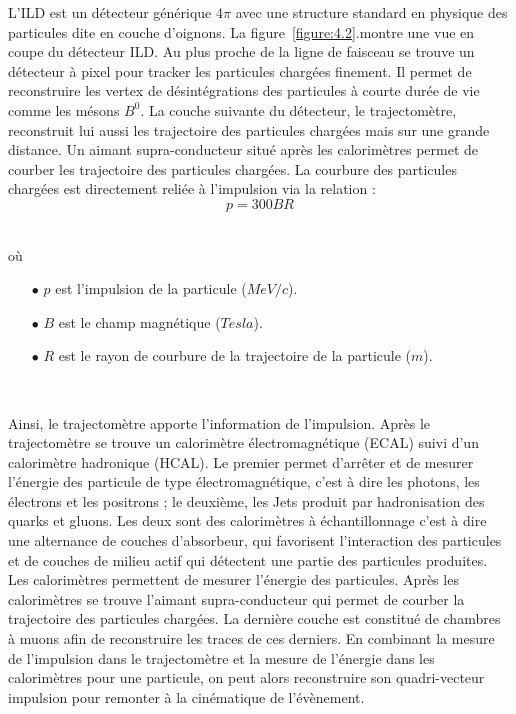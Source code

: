 L'ILD est un d\'etecteur g\'en\'erique $4\pi$ avec une structure standard en physique des particules dite en couche d'oignons. La figure~\ref{figure:4.2}.montre une vue en coupe du d\'etecteur ILD. Au plus proche de la ligne de faisceau se trouve un d\'etecteur \`a pixel pour tracker les particules charg\'ees finement. Il permet de reconstruire les vertex de d\'esintégrations des particules \`a courte dur\'ee de vie comme les m\'esons $B^{0}$. La couche suivante du d\'etecteur, le trajectom\`etre, reconstruit lui aussi les trajectoire des particules charg\'ees mais sur une grande distance. Un aimant supra-conducteur situ\'e apr\`es les calorim\`etres permet de courber les trajectoire des particules charg\'ees. La courbure des particules charg\'ees est directement reli\'ee \`a l'impulsion via la relation :
$$p = 300BR$$
~\par o\`u
\begin{itemize}
  \item[$\bullet$] $p$ est l'impulsion de la particule ($MeV/c$).
  \item[$\bullet$] $B$ est le champ magn\'etique ($Tesla$).
  \item[$\bullet$] $R$ est le rayon de courbure de la trajectoire de la particule ($m$).
\end{itemize}
~\par Ainsi, le trajectom\`etre apporte l'information de l'impulsion. Apr\`es le trajectom\`etre se trouve un calorim\`etre \'electromagn\'etique (ECAL) suivi d'un calorim\`etre hadronique (HCAL). Le premier permet d'arr\^eter et de mesurer l'\'energie des particule de type \'electromagn\'etique, c'est \`a dire les photons, les \'electrons et les positrons ; le deuxi\`eme, les Jets produit par hadronisation des quarks et gluons. Les deux sont des calorim\`etres \`a \'echantillonnage c'est \`a dire une alternance de couches d'absorbeur, qui favorisent l'interaction des particules et de couches de milieu actif qui d\'etectent une partie des particules produites. Les calorim\`etres permettent de mesurer l'\'energie des particules. Apr\`es les calorim\`etres se trouve l'aimant supra-conducteur qui permet de courber la trajectoire des particules charg\'ees. La derni\`ere couche est constitu\'e de chambres \`a muons afin de reconstruire les traces de ces derniers. En combinant la mesure de l'impulsion dans le trajectom\`etre et la mesure de l'\'energie dans les calorim\`etres pour une particule, on peut alors reconstruire son quadri-vecteur impulsion pour remonter \`a la cin\'ematique de l'\'ev\`enement.
     
